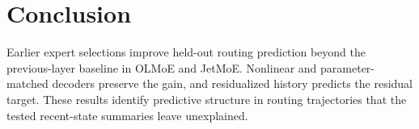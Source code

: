 \documentclass[10pt,letterpaper,twocolumn]{yalearxiv}
\begin{document}
\section{Conclusion}
Earlier expert selections improve held-out routing prediction beyond the previous-layer baseline in OLMoE and JetMoE. Nonlinear and parameter-matched decoders preserve the gain, and residualized history predicts the residual target. These results identify predictive structure in routing trajectories that the tested recent-state summaries leave unexplained.

\clearpage
\balance
\renewcommand{\bibpreamble}{\interlinepenalty=10000}


\end{document}
